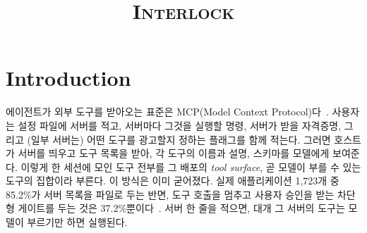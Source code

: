 \documentclass[acmsmall,screen,review,anonymous]{acmart}
\begin{document}
\title{\textsc{Interlock}}

\begin{abstract}
\end{abstract}


\maketitle

\section{Introduction}
\label{sec:intro}

에이전트가 외부 도구를 받아오는 표준은 MCP(Model Context Protocol)다~\cite{gaire2026systematization}. 사용자는 설정 파일에 서버를 적고, 서버마다 그것을 실행할 명령, 서버가 받을 자격증명, 그리고 (일부 서버는) 어떤 도구를 광고할지 정하는 플래그를 함께 적는다. 그러면 호스트가 서버를 띄우고 도구 목록을 받아, 각 도구의 이름과 설명, 스키마를 모델에게 보여준다. 이렇게 한 세션에 모인 도구 전부를 그 배포의 \emph{tool surface}, 곧 모델이 부를 수 있는 도구의 집합이라 부른다. 이 방식은 이미 굳어졌다. 실제 애플리케이션 1,723개 중 85.2\%가 서버 목록을 파일로 두는 반면, 도구 호출을 멈추고 사용자 승인을 받는 차단형 게이트를 두는 것은 37.2\%뿐이다~\cite{majeed2026empirical}. 서버 한 줄을 적으면, 대개 그 서버의 도구는 모델이 부르기만 하면 실행된다.
\end{document}
